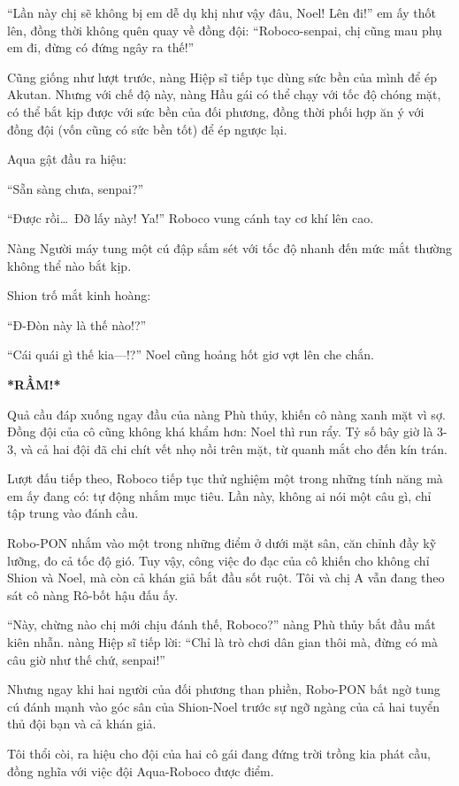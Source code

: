 \documentclass[../main.tex]{subfiles}
\begin{document}
``Lần này chị sẽ không bị em dễ dụ khị như vậy đâu, Noel! Lên đi!'' em ấy thốt lên, đồng thời không quên quay về đồng đội: ``Roboco-senpai, chị cũng mau phụ em đi, đừng có đứng ngây ra thế!''

Cũng giống như lượt trước, nàng Hiệp sĩ tiếp tục dùng sức bền của mình để ép Akutan. Nhưng với chế độ này, nàng Hầu gái có thể chạy với tốc độ chóng mặt, có thể bắt kịp được với sức bền của đối phương, đồng thời phối hợp ăn ý với đồng đội (vốn cũng có sức bền tốt) để ép ngược lại.

Aqua gật đầu ra hiệu:

``Sẵn sàng chưa, senpai?''

``Được rồi\dots\ Đỡ lấy này! Ya!'' Roboco vung cánh tay cơ khí lên cao.

Nàng Người máy tung một cú đập sấm sét với tốc độ nhanh đến mức mắt thường không thể nào bắt kịp.

Shion trố mắt kinh hoàng:

``Đ-Đòn này là thế nào!?''

``Cái quái gì thế kia---!?'' Noel cũng hoảng hốt giơ vợt lên che chắn.

\textbf{*RẦM!*}

Quả cầu đáp xuống ngay đầu của nàng Phù thủy, khiến cô nàng xanh mặt vì sợ. Đồng đội của cô cũng không khá khẩm hơn: Noel thì run rẩy. Tỷ số bây giờ là 3-3, và cả hai đội đã chi chít vết nhọ nồi trên mặt, từ quanh mắt cho đến kín trán.

Lượt đấu tiếp theo, Roboco tiếp tục thử nghiệm một trong những tính năng mà em ấy đang có: tự động nhắm mục tiêu. Lần này, không ai nói một câu gì, chỉ tập trung vào đánh cầu.

Robo-PON nhắm vào một trong những điểm ở dưới mặt sân, căn chỉnh đầy kỹ lưỡng, đo cả tốc độ gió. Tuy vậy, công việc đo đạc của cô khiến cho không chỉ Shion và Noel, mà còn cả khán giả bắt đầu sốt ruột. Tôi và chị A vẫn đang theo sát cô nàng Rô-bốt hậu đấu ấy.

``Này, chừng nào chị mới chịu đánh thế, Roboco?'' nàng Phù thủy bắt đầu mất kiên nhẫn. nàng Hiệp sĩ tiếp lời: ``Chỉ là trò chơi dân gian thôi mà, đừng có mà câu giờ như thế chứ, senpai!''

Nhưng ngay khi hai người của đối phương than phiền, Robo-PON bất ngờ tung cú đánh mạnh vào góc sân của Shion-Noel trước sự ngỡ ngàng của cả hai tuyển thủ đội bạn và cả khán giả.

Tôi thổi còi, ra hiệu cho đội của hai cô gái đang đứng trời trồng kia phát cầu, đồng nghĩa với việc đội Aqua-Roboco được điểm.
\end{document}
